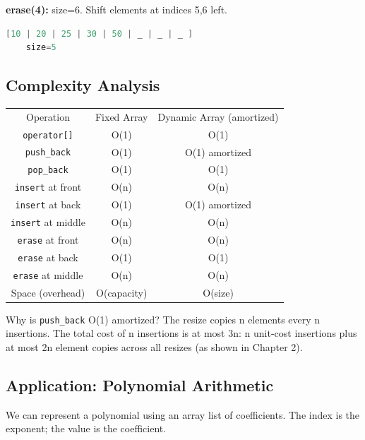 \textbf{erase(4):} size=6. Shift elements at indices 5,6 left.
\begin{lstlisting}[language=Java]
    [10 | 20 | 25 | 30 | 50 | _ | _ | _ ]
    size=5
\end{lstlisting}

\subsection{Complexity Analysis}

\begin{center}
\begin{tabular}{ccc}
\toprule
Operation & Fixed Array & Dynamic Array (amortized) \\
\texttt{operator[]} & O(1) & O(1) \\
\texttt{push\_back} & O(1) & O(1) amortized \\
\texttt{pop\_back} & O(1) & O(1) \\
\texttt{insert} at front & O(n) & O(n) \\
\texttt{insert} at back & O(1) & O(1) amortized \\
\texttt{insert} at middle & O(n) & O(n) \\
\texttt{erase} at front & O(n) & O(n) \\
\texttt{erase} at back & O(1) & O(1) \\
\texttt{erase} at middle & O(n) & O(n) \\
Space (overhead) & O(capacity) & O(size) \\

\bottomrule
\end{tabular}
\end{center}
Why is \texttt{push\_back} O(1) amortized? The resize copies n elements every n insertions. The total cost of n insertions is at most 3n: n unit-cost insertions plus at most 2n element copies across all resizes (as shown in Chapter 2).

\subsection{Application: Polynomial Arithmetic}

We can represent a polynomial using an array list of coefficients. The index is the exponent; the value is the coefficient.

